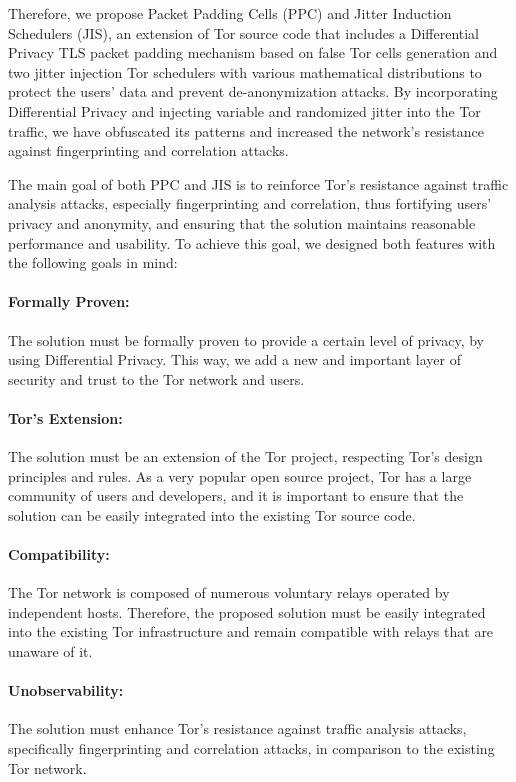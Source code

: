 Therefore, we propose Packet Padding Cells (PPC) and Jitter Induction Schedulers (JIS), an extension of Tor source code that includes a Differential Privacy TLS packet padding mechanism based on false Tor cells generation and two jitter injection Tor schedulers with various mathematical distributions to protect the users' data and prevent de-anonymization attacks. By incorporating Differential Privacy and injecting variable and randomized jitter into the Tor traffic, we have obfuscated its patterns and increased the network's resistance against fingerprinting and correlation attacks.

The main goal of both PPC and JIS is to reinforce Tor's resistance against traffic analysis attacks, especially fingerprinting and correlation, thus fortifying users' privacy and anonymity, and ensuring that the solution maintains reasonable performance and usability. To achieve this goal, we designed both features with the following goals in mind:
\paragraph{Formally Proven:} The solution must be formally proven to provide a certain level of privacy, by using Differential Privacy. This way, we add a new and important layer of security and trust to the Tor network and users.
\paragraph{Tor's Extension:} The solution must be an extension of the Tor project, respecting Tor's design principles and rules. As a very popular open source project, Tor has a large community of users and developers, and it is important to ensure that the solution can be easily integrated into the existing Tor source code.
\paragraph{Compatibility:} The Tor network is composed of numerous voluntary relays operated by independent hosts. Therefore, the proposed solution must be easily integrated into the existing Tor infrastructure and remain compatible with relays that are unaware of it.
\paragraph{Unobservability:} The solution must enhance Tor's resistance against traffic analysis attacks, specifically fingerprinting and correlation attacks, in comparison to the existing Tor network. 

